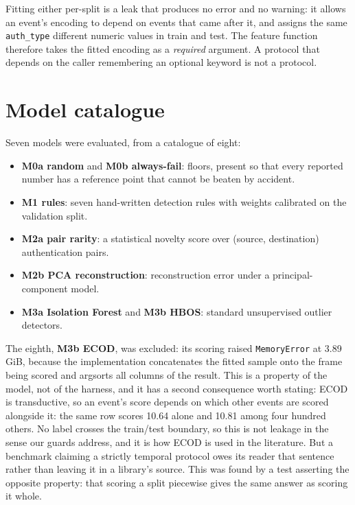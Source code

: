 \documentclass[11pt,a4paper]{article}
\begin{document}
Fitting either per-split is a leak that produces no error and no warning: it
allows an event's encoding to depend on events that came after it, and assigns
the same \texttt{auth\_type} different numeric values in train and test. The
feature function therefore takes the fitted encoding as a \emph{required}
argument. A protocol that depends on the caller remembering an optional keyword
is not a protocol.

\section{Model catalogue}
\label{sec:models}

Seven models were evaluated, from a catalogue of eight:

\begin{itemize}
  \item \textbf{M0a random} and \textbf{M0b always-fail}: floors, present so
  that every reported number has a reference point that cannot be beaten by
  accident.
  \item \textbf{M1 rules}: seven hand-written detection rules with weights
  calibrated on the validation split.
  \item \textbf{M2a pair rarity}: a statistical novelty score over
  (source, destination) authentication pairs.
  \item \textbf{M2b PCA reconstruction}: reconstruction error under a
  principal-component model.
  \item \textbf{M3a Isolation Forest} and \textbf{M3b HBOS}: standard
  unsupervised outlier detectors.
\end{itemize}

The eighth, \textbf{M3b ECOD}, was excluded: its scoring raised
\texttt{MemoryError} at 3.89\,GiB, because the implementation concatenates the
fitted sample onto the frame being scored and argsorts all columns of the result.
This is a property of the model, not of the harness, and it has a second
consequence worth stating: ECOD is transductive, so an event's score depends on
which other events are scored alongside it: the same row scores 10.64 alone
and 10.81 among four hundred others. No label crosses the train/test boundary, so
this is not leakage in the sense our guards address, and it is how ECOD is used
in the literature. But a benchmark claiming a strictly temporal protocol owes its
reader that sentence rather than leaving it in a library's source. This was found
by a test asserting the opposite property: that scoring a split piecewise
gives the same answer as scoring it whole.
\end{document}
